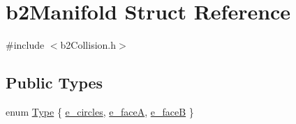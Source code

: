 \hypertarget{structb2_manifold}{}\section{b2\+Manifold Struct Reference}
\label{structb2_manifold}


{\ttfamily \#include $<$b2\+Collision.\+h$>$}

\subsection*{Public Types}
\begin{DoxyCompactItemize}
\item 
enum \mbox{\hyperlink{structb2_manifold_aa9c347e2ff2e27ee820a926efbb33e12}{Type}} \{ \mbox{\hyperlink{structb2_manifold_aa9c347e2ff2e27ee820a926efbb33e12a8263240a3d2b01ca3c19dff3f5fad008}{e\+\_\+circles}}, 
\mbox{\hyperlink{structb2_manifold_aa9c347e2ff2e27ee820a926efbb33e12a42af1689472a0f5c7797ef196b9a666b}{e\+\_\+faceA}}, 
\mbox{\hyperlink{structb2_manifold_aa9c347e2ff2e27ee820a926efbb33e12a08643d45b9a9e499dfc774d2cafb8fd2}{e\+\_\+faceB}}
 \}
\end{DoxyCompactItemize}
